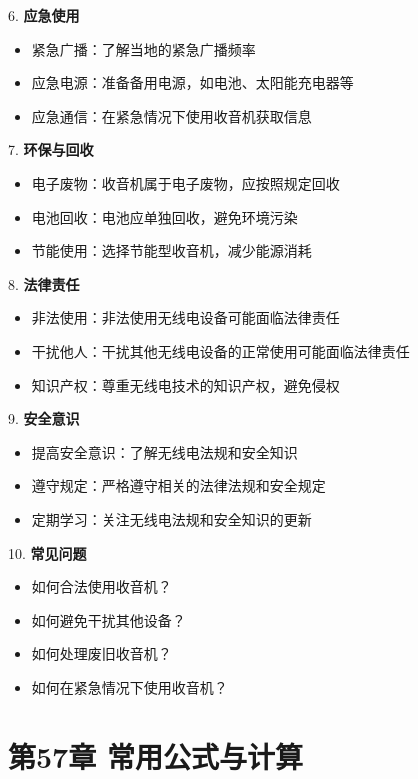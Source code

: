 \documentclass[12pt,UTF8]{ctexbook}
\begin{document}
6. \textbf{应急使用}
   \begin{itemize}[leftmargin=3.5em]
   \item 紧急广播：了解当地的紧急广播频率
   \item 应急电源：准备备用电源，如电池、太阳能充电器等
   \item 应急通信：在紧急情况下使用收音机获取信息
   \end{itemize}

7. \textbf{环保与回收}
   \begin{itemize}[leftmargin=3.5em]
   \item 电子废物：收音机属于电子废物，应按照规定回收
   \item 电池回收：电池应单独回收，避免环境污染
   \item 节能使用：选择节能型收音机，减少能源消耗
   \end{itemize}

8. \textbf{法律责任}
   \begin{itemize}[leftmargin=3.5em]
   \item 非法使用：非法使用无线电设备可能面临法律责任
   \item 干扰他人：干扰其他无线电设备的正常使用可能面临法律责任
   \item 知识产权：尊重无线电技术的知识产权，避免侵权
   \end{itemize}

9. \textbf{安全意识}
   \begin{itemize}[leftmargin=3.5em]
   \item 提高安全意识：了解无线电法规和安全知识
   \item 遵守规定：严格遵守相关的法律法规和安全规定
   \item 定期学习：关注无线电法规和安全知识的更新
   \end{itemize}

10. \textbf{常见问题}
    \begin{itemize}[leftmargin=3.5em]
    \item 如何合法使用收音机？
    \item 如何避免干扰其他设备？
    \item 如何处理废旧收音机？
    \item 如何在紧急情况下使用收音机？
    \end{itemize}

\chapter*{第57章 常用公式与计算}
\end{document}
